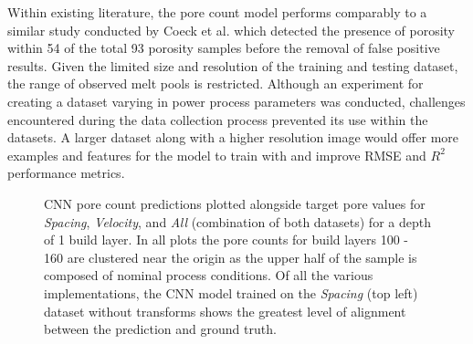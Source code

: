 Within existing literature, the pore count model performs comparably to a
similar study conducted by Coeck et al. \cite{coeck_prediction_2019} which
detected the presence of porosity within 54 of the total 93 porosity samples
before the removal of false positive results. Given the limited size and
resolution of the training and testing dataset, the range of observed melt pools
is restricted. Although an experiment for creating a dataset varying in power
process parameters was conducted, challenges encountered during the data
collection process prevented its use within the datasets. A larger dataset along
with a higher resolution image would offer more examples and features for the
model to train with and improve RMSE and $R^2$ performance metrics. 

\begin{figure}[bt]
  \centering
  
  \caption{
    CNN pore count predictions plotted alongside target pore values for
    \textit{Spacing}, \textit{Velocity}, and \textit{All} (combination of both
    datasets) for a depth of 1 build layer. In all plots the pore counts for
    build layers 100 - 160 are clustered near the origin as the upper half of
    the sample is composed of nominal process conditions. Of all the various
    implementations, the CNN model trained on the \textit{Spacing} (top left)
    dataset without transforms shows the greatest level of alignment between the
    prediction and ground truth.
  }
  \label{fig:pore_count_results}
\end{figure}

